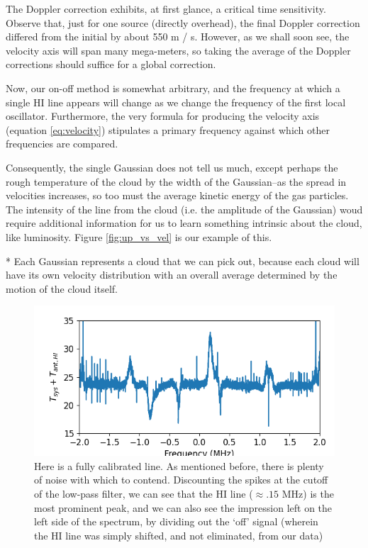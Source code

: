 \documentclass[12pt]{article}
\begin{document}
The Doppler correction exhibits, at first glance, a critical time sensitivity. Observe that, just for one source (directly overhead), the final Doppler correction differed from the initial by about 550 m / s. However, as we shall soon see, the velocity axis will span many mega-meters, so taking the average of the Doppler corrections should suffice for a global correction.

Now, our on-off method is somewhat arbitrary, and the frequency at which a single HI line appears will change as we change the frequency of the first local oscillator. Furthermore, the very formula for producing the velocity axis (equation \ref{eq:velocity}) stipulates a primary frequency against which other frequencies are compared.

Consequently, the single Gaussian does not tell us much, except perhaps the rough temperature of the cloud by the width of the Gaussian--as the spread in velocities increases, so too must the average kinetic energy of the gas particles. The intensity of the line from the cloud (i.e. the amplitude of the Gaussian) woud require additional information for us to learn something intrinsic about the cloud, like luminosity. Figure \ref{fig:up_vs_vel} is our example of this.

* Each Gaussian represents a cloud that we can pick out,
because each cloud will have its own velocity distribution with an overall average determined by the motion of the cloud itself.

\begin{figure}
	\centering
	\includegraphics[width=.6\linewidth]{up_vs_frq}
	\caption{Here is a fully calibrated line. As mentioned before, there is plenty of noise with which to contend. Discounting the spikes at the cutoff of the low-pass filter, we can see that the HI line ($\approx .15$ MHz) is the most prominent peak, and we can also see the impression left on the left side of the spectrum, by dividing out the `off' signal (wherein the HI line was simply shifted, and not eliminated, from our data)}
	\label{fig:up_vs_frq}
\end{figure}
\end{document}
